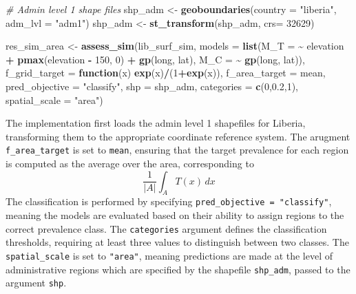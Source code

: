 \documentclass[
  letterpaper,
]{krantz}
\newenvironment{Shaded}{\begin{snugshade}}{\end{snugshade}}
\newcommand{\AttributeTok}[1]{\textcolor[rgb]{0.13,0.29,0.53}{#1}}
\newcommand{\CommentTok}[1]{\textcolor[rgb]{0.56,0.35,0.01}{\textit{#1}}}
\newcommand{\ControlFlowTok}[1]{\textcolor[rgb]{0.13,0.29,0.53}{\textbf{#1}}}
\newcommand{\DecValTok}[1]{\textcolor[rgb]{0.00,0.00,0.81}{#1}}
\newcommand{\FloatTok}[1]{\textcolor[rgb]{0.00,0.00,0.81}{#1}}
\newcommand{\FunctionTok}[1]{\textcolor[rgb]{0.13,0.29,0.53}{\textbf{#1}}}
\newcommand{\NormalTok}[1]{#1}
\newcommand{\OtherTok}[1]{\textcolor[rgb]{0.56,0.35,0.01}{#1}}
\newcommand{\SpecialCharTok}[1]{\textcolor[rgb]{0.81,0.36,0.00}{\textbf{#1}}}
\newcommand{\StringTok}[1]{\textcolor[rgb]{0.31,0.60,0.02}{#1}}
\begin{document}
\begin{Shaded}
\begin{Highlighting}[]
\CommentTok{\# Admin level 1 shape files}
\NormalTok{shp\_adm }\OtherTok{\textless{}{-}} \FunctionTok{geoboundaries}\NormalTok{(}\AttributeTok{country =} \StringTok{"liberia"}\NormalTok{, }\AttributeTok{adm\_lvl =} \StringTok{"adm1"}\NormalTok{)}
\NormalTok{shp\_adm }\OtherTok{\textless{}{-}} \FunctionTok{st\_transform}\NormalTok{(shp\_adm, }\AttributeTok{crs=} \DecValTok{32629}\NormalTok{)}

\NormalTok{res\_sim\_area }\OtherTok{\textless{}{-}} \FunctionTok{assess\_sim}\NormalTok{(lib\_surf\_sim,}
                      \AttributeTok{models =} \FunctionTok{list}\NormalTok{(}\AttributeTok{M\_T =} \SpecialCharTok{\textasciitilde{}}\NormalTok{  elevation }\SpecialCharTok{+}
                                      \FunctionTok{pmax}\NormalTok{(elevation }\SpecialCharTok{{-}} \DecValTok{150}\NormalTok{, }\DecValTok{0}\NormalTok{) }\SpecialCharTok{+}
                                      \FunctionTok{gp}\NormalTok{(long, lat),}
                                    \AttributeTok{M\_C =} \SpecialCharTok{\textasciitilde{}} \FunctionTok{gp}\NormalTok{(long, lat)),}
                      \AttributeTok{f\_grid\_target =} \ControlFlowTok{function}\NormalTok{(x) }\FunctionTok{exp}\NormalTok{(x)}\SpecialCharTok{/}\NormalTok{(}\DecValTok{1}\SpecialCharTok{+}\FunctionTok{exp}\NormalTok{(x)),}
                      \AttributeTok{f\_area\_target =}\NormalTok{ mean,}
                      \AttributeTok{pred\_objective =} \StringTok{"classify"}\NormalTok{, }\AttributeTok{shp =}\NormalTok{ shp\_adm,}
                      \AttributeTok{categories =} \FunctionTok{c}\NormalTok{(}\DecValTok{0}\NormalTok{,}\FloatTok{0.2}\NormalTok{,}\DecValTok{1}\NormalTok{),}
                      \AttributeTok{spatial\_scale =} \StringTok{"area"}\NormalTok{)}
\end{Highlighting}
\end{Shaded}

The implementation first loads the admin level 1 shapefiles for Liberia,
transforming them to the appropriate coordinate reference system. The
arugment \texttt{f\_area\_target} is set to \texttt{mean}, ensuring that
the target prevalence for each region is computed as the average over
the area, corresponding to\\
\[
\frac{1}{|A|} \int_A T(x) \, dx
\] The classification is performed by specifying
\texttt{pred\_objective\ =\ "classify"}, meaning the models are
evaluated based on their ability to assign regions to the correct
prevalence class. The \texttt{categories} argument defines the
classification thresholds, requiring at least three values to
distinguish between two classes. The \texttt{spatial\_scale} is set to
\texttt{"area"}, meaning predictions are made at the level of
administrative regions which are specified by the shapefile
\texttt{shp\_adm}, passed to the argument \texttt{shp}.
\end{document}

